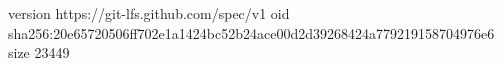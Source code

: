 version https://git-lfs.github.com/spec/v1
oid sha256:20e65720506ff702e1a1424bc52b24ace00d2d39268424a779219158704976e6
size 23449
